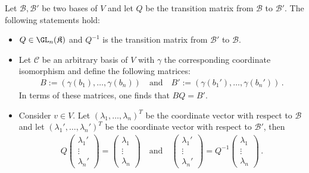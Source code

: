     \begin{property}\label{linalgebra:transition_matrix_properties}
        Let $\mathcal{B},\mathcal{B}'$ be two bases of $V$ and let $Q$ be the transition matrix from $\mathcal{B}$ to $\mathcal{B}'$. The following statements hold:
        \begin{itemize}
            \item $Q\in\GL_n(\mathfrak{K})$ and $Q^{-1}$ is the transition matrix from $\mathcal{B}'$ to $\mathcal{B}$.
            \item Let $\mathcal{C}$ be an arbitrary basis of $V$ with $\gamma$ the corresponding coordinate isomorphism and define the following matrices:
            \begin{gather}
                B:=(\gamma(b_1),\ldots,\gamma(b_n)) \quad\text{and}\quad B':=(\gamma(b_1'),\ldots,\gamma(b_n'))\,.
            \end{gather}
            In terms of these matrices, one finds that $BQ = B'$.
            \item Consider $v\in V$. Let $(\lambda_1,\ldots,\lambda_n)^T$ be the coordinate vector with respect to $\mathcal{B}$ and let $(\lambda_1',\ldots,\lambda_n')^T$ be the coordinate vector with respect to $\mathcal{B}'$, then
            \begin{gather}
                Q
                \begin{pmatrix}
                    \lambda_1'\\\vdots\\\lambda_n'
                \end{pmatrix}
                =
                \begin{pmatrix}
                    \lambda_1\\\vdots\\\lambda_n
                \end{pmatrix}
                \quad\text{and}\quad
                \begin{pmatrix}
                    \lambda_1'\\\vdots\\\lambda_n'
                \end{pmatrix}
                = Q^{-1}
                \begin{pmatrix}
                    \lambda_1\\\vdots\\\lambda_n
                \end{pmatrix}\,.
            \end{gather}
        \end{itemize}
    \end{property}
